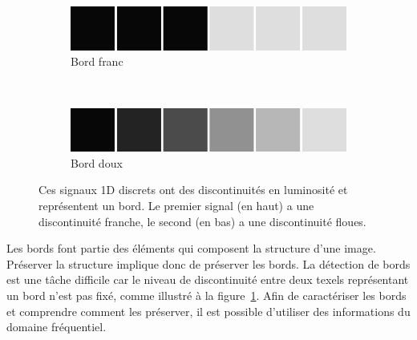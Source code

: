 \begin{figure}[h]
    \centering
    \begin{subfigure}[b]{.45\textwidth}
        \centering
        \includegraphics[width=\textwidth]{contenu/resources/images/discrete_discontinuity}
        \caption{Bord franc}
    \end{subfigure}
    \\
    \vspace{1em}
    \begin{subfigure}[b]{.45\textwidth}
        \centering
        \includegraphics[width=\textwidth]{contenu/resources/images/discrete_smooth}
        \caption{Bord doux}
    \end{subfigure}
    \caption[Difficulté à définir un bord]{Ces signaux 1D discrets ont des discontinuités en luminosité et représentent un bord. Le premier signal (en haut) a une discontinuité franche, le second (en bas) a une discontinuité floues.}
    \label{fig:edge-difficulty}
\end{figure}

Les bords font partie des éléments qui composent la structure d'une image. Préserver la structure implique donc de préserver les bords. La détection de bords est une tâche difficile car le niveau de discontinuité entre deux texels représentant un bord n'est pas fixé, comme illustré à la figure~\ref{fig:edge-difficulty}. Afin de caractériser les bords et comprendre comment les préserver, il est possible d'utiliser des informations du domaine fréquentiel.

\bigskip

